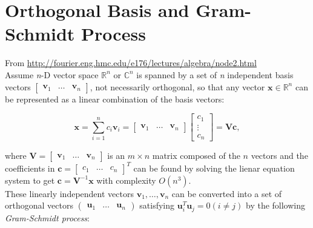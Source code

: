 \documentclass[10pt,b5paper,titlepage]{book}
\begin{document}
\chapter{Orthogonal Basis and Gram-Schmidt Process}

From \url{http://fourier.eng.hmc.edu/e176/lectures/algebra/node2.html}\\

Assume \textit{n}-D vector space $\mathbb{R}^{n}$ or $\mathbb{C}^{n}$ is spanned
by a set of \textit{n} independent basis vectors $\begin{bmatrix} \mathbf{v}_1 & \ldots & \mathbf{v}_n \end{bmatrix}$,
not necessarily orthogonal, so that any vector $\mathbf{x} \in \mathbb{R}^{n}$
can be represented as a linear combination of the basis vectors:

\begin{equation}
    \mathbf{x}
    = \sum_{i=1}^{n} c_{i} \mathbf{v}_{i}
    = \begin{bmatrix} \mathbf{v}_1 & \ldots & \mathbf{v}_n \end{bmatrix}
    \begin{bmatrix} c_1\\ \vdots\\ c_n \end{bmatrix}
    = \mathbf{V} \mathbf{c}
,\end{equation}

where $\mathbf{V} = \begin{bmatrix} \mathbf{v}_1 & \ldots & \mathbf{v}_n \end{bmatrix}$ is an
$m \times n$ matrix composed of the $n$ vectors and the coefficients in
$\mathbf{c} = \begin{bmatrix} c_1 & \ldots & c_n \end{bmatrix}^{T}$ can be
found by solving the lienar equation system to get
$\mathbf{c} = \mathbf{V}^{-1}\mathbf{x}$ with complexity $\mathit{O}(n^{3})$.\\

These linearly independent vectors $\mathbf{v}_{1}, \ldots, \mathbf{v}_{n}$ can be
converted into a set of orthogonal vectors $\begin{pmatrix} \mathbf{u}_1 & \ldots & \mathbf{u}_n \end{pmatrix}$
satisfying $\mathbf{u}_{i}^{T}\mathbf{u}_{j} = 0 (i \neq j)$ by the following
\textit{Gram-Schmidt process}:
\end{document}
